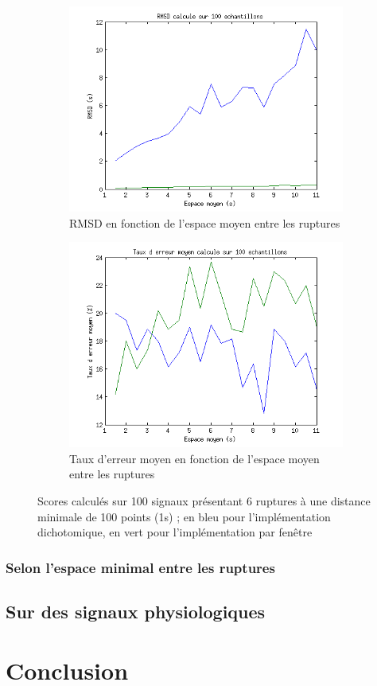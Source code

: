 \documentclass[french,11pt,notitlepage]{report}
\begin{document}
	\begin{figure}[h]
		\begin{subfigure}[t]{.49\textwidth}
		  \includegraphics[width=\linewidth,height=.24\textheight]{rmsd_mean}
			\caption{RMSD en fonction de l'espace moyen entre les ruptures}
			\label{}
		\end{subfigure}
		\hfill
		\begin{subfigure}[t]{.49\textwidth}
			\includegraphics[width=\linewidth,height=.24\textheight]{erratemean_mean}
			\caption{Taux d'erreur moyen en fonction de l'espace moyen entre les ruptures}
			\label{}
		\end{subfigure}
	\caption{Scores calculés sur 100 signaux présentant 6 ruptures à une distance minimale de 100 points (1s) ; en bleu pour l'implémentation dichotomique, en vert pour l'implémentation par fenêtre}
	\label{}
	\end{figure}
	
	
	\subsection{Selon l'espace minimal entre les ruptures}
	
	
	\section{Sur des signaux physiologiques}
	
	
	
	\chapter{Conclusion}
	
	
	


	
\end{document}
